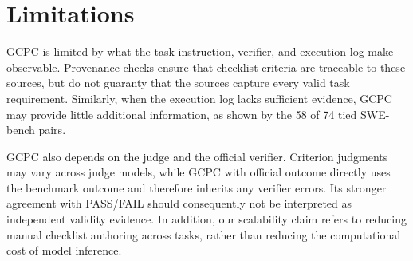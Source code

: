 \documentclass[sigconf,nonacm]{acmart}
\begin{document}


\section{Limitations}
\label{sec:limitations}
GCPC is limited by what the task instruction, verifier, and execution log make
observable. Provenance checks ensure that checklist criteria are traceable to
these sources, but do not guaranty that the sources capture every valid task
requirement. Similarly, when the execution log lacks sufficient evidence, GCPC
may provide little additional information, as shown by the 58 of 74 tied
SWE-bench pairs.

GCPC also depends on the judge and the official verifier. Criterion judgments
may vary across judge models, while GCPC with official outcome directly uses
the benchmark outcome and therefore inherits any verifier errors. Its stronger
agreement with PASS/FAIL should consequently not be interpreted as independent
validity evidence. In addition, our scalability claim refers to reducing manual checklist authoring across tasks, rather than reducing the computational cost of model inference.

\end{document}
